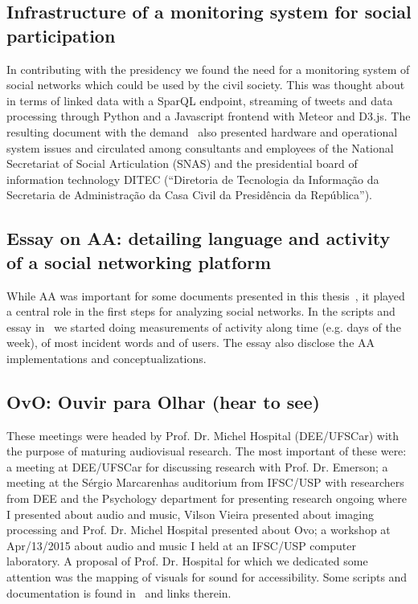 \begin{apendicesenv}
\subsection{Infrastructure of a monitoring system for social participation}
In contributing with the presidency we found the need for a monitoring system of social networks
which could be used by the civil society.
This was thought about in terms of linked data with a SparQL endpoint, streaming of tweets and data processing through Python
and a Javascript frontend with Meteor and D3.js.
The resulting document with the demand~\cite{sm} also presented hardware and operational system issues
and circulated among consultants and employees of the National Secretariat of Social Articulation (SNAS) and 
the presidential board of information technology DITEC (``Diretoria de Tecnologia da Informação da Secretaria de Administração da Casa Civil da Presidência da República'').

\subsection{Essay on AA: detailing language and activity of a social networking platform}
While AA was important for some documents presented in this thesis~\cite{aaPaper,losd},
it played a central role in the first steps for analyzing social networks.
In the scripts and essay in~\cite{ensaaio} we started doing measurements of activity along time (e.g. days of the week),
of most incident words and of users.
The essay also disclose the AA implementations and conceptualizations.

\subsection{OvO: Ouvir para Olhar (hear to see)}
These meetings were headed by Prof. Dr. Michel Hospital (DEE/UFSCar)
with the purpose of maturing audiovisual research.
The most important of these were: a meeting at DEE/UFSCar for discussing research with Prof. Dr. Emerson;
a meeting at the Sérgio Marcarenhas auditorium from IFSC/USP with researchers from DEE and the Psychology department
for presenting research ongoing where I presented about audio and music, Vilson Vieira presented about imaging processing
and Prof. Dr. Michel Hospital presented about Ovo;
a workshop at Apr/13/2015 about audio and music I held at an IFSC/USP computer laboratory.
A proposal of Prof. Dr. Hospital for which we dedicated some attention was the
mapping of visuals for sound for accessibility.
Some scripts and documentation is found in~\cite{ovo} and links therein.


\end{apendicesenv}
